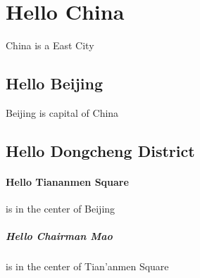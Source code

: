 \documentclass[•]{article}
\begin{document}
\tableofcontents
\section{Hello China} China is a East City
\subsection{Hello Beijing}	Beijing is capital of China
\subsection{Hello Dongcheng District}
\paragraph{Hello Tiananmen Square} is in the center of Beijing
\subparagraph{Hello Chairman Mao} is in the center of Tian'anmen Square
\end{document}
